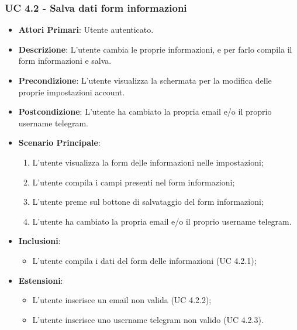 			\subsubsection{UC 4.2 - Salva dati form informazioni}
			\begin{itemize}
				\item \textbf{Attori Primari}: Utente autenticato.
				\item \textbf{Descrizione}: L'utente cambia le proprie informazioni, e per farlo compila il form informazioni e salva.
				\item \textbf{Precondizione}: L'utente visualizza la schermata per la modifica delle proprie impostazioni account.
				\item \textbf{Postcondizione}: L'utente ha cambiato la propria email e/o il proprio username telegram.
				\item \textbf{Scenario Principale}:
				\begin{enumerate}
					\item{L'utente visualizza la form delle informazioni nelle impostazioni;}
					\item{L'utente compila i campi presenti nel form informazioni;}
					\item{L'utente preme sul bottone di salvataggio del form informazioni;}
					\item{L'utente ha cambiato la propria email e/o il proprio username telegram.}
				\end{enumerate}	
				\item \textbf{Inclusioni}:
					\begin{itemize}
						\item L'utente compila i dati del form delle informazioni (UC 4.2.1);
					\end{itemize}
				\item \textbf{Estensioni}:
					\begin{itemize}
						\item L'utente inserisce un email non valida (UC 4.2.2);
						\item L'utente inserisce uno username telegram non valido (UC 4.2.3).
					\end{itemize}
			\end{itemize}

